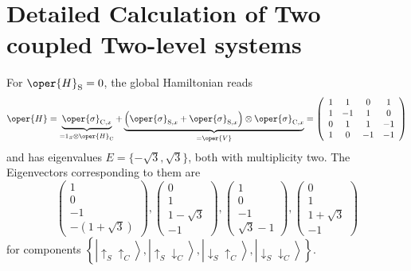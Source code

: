 \chapter{Detailed Calculation of Two coupled Two-level systems\label{app:chap3_appendix}}
For $\oper{H}_{\mathrm{S}}=0$, the global Hamiltonian reads
\begin{equation}
\oper{H}=\underbrace{\oper{\sigma}_{\mathrm{C}, x}}_{=1_S \otimes \oper{H}_{\mathrm{C}}}+\underbrace{\left(\oper{\sigma}_{\mathrm{S}, x}+\oper{\sigma}_{\mathrm{S}, x}\right) \otimes \oper{\sigma}_{\mathrm{C}, x}}_{=\oper{V}}=\left(\begin{array}{cccc}
1 & 1 & 0 & 1 \\
1 & -1 & 1 & 0 \\
0 & 1 & 1 & -1 \\
1 & 0 & -1 & -1
\end{array}\right)
\end{equation}
and has eigenvalues
\(E=\{-\sqrt{3}, \sqrt{3}\}\), 
both with multiplicity two. The Eigenvectors corresponding to them are
\begin{equation}
\begin{pmatrix}
1 \\
0 \\
-1 \\
-(1+\sqrt{3})
\end{pmatrix},\begin{pmatrix}
0 \\
1 \\
1-\sqrt{3} \\
-1
\end{pmatrix},\begin{pmatrix}
1 \\
0 \\
-1 \\
\sqrt{3}-1
\end{pmatrix},\begin{pmatrix}
0 \\
1 \\
1+\sqrt{3} \\
-1
\end{pmatrix}
\end{equation}
for components $\left\{\left|\uparrow_S \uparrow_C
\right\rangle,\left|\uparrow_S \downarrow_C\right\rangle,
\left|\downarrow_S \uparrow_C\right\rangle,\left|\downarrow_S 
\downarrow_C\right\rangle\right\}$. 

